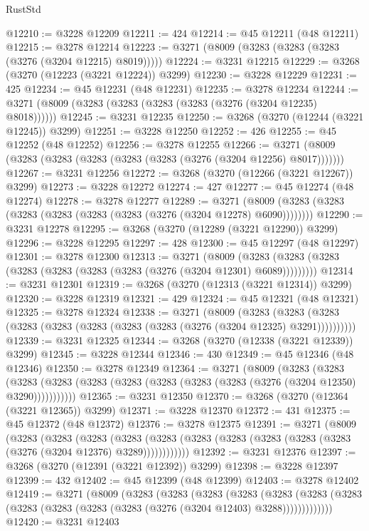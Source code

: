 \begin{lexlean}{RustStd}
\begin{coremodule}
@12210 := @3228 @12209
@12211 := 424
@12214 := @45 @12211 (@48 @12211)
@12215 := @3278 @12214
@12223 := @3271 (@8009 (@3283 (@3283 (@3283 (@3276 (@3204 @12215) @8019)))))
@12224 := @3231 @12215
@12229 := @3268 (@3270 (@12223 (@3221 @12224)) @3299)
@12230 := @3228 @12229
@12231 := 425
@12234 := @45 @12231 (@48 @12231)
@12235 := @3278 @12234
@12244 := @3271 (@8009 (@3283 (@3283 (@3283 (@3283 (@3276 (@3204 @12235) @8018))))))
@12245 := @3231 @12235
@12250 := @3268 (@3270 (@12244 (@3221 @12245)) @3299)
@12251 := @3228 @12250
@12252 := 426
@12255 := @45 @12252 (@48 @12252)
@12256 := @3278 @12255
@12266 := @3271 (@8009 (@3283 (@3283 (@3283 (@3283 (@3283 (@3276 (@3204 @12256) @8017)))))))
@12267 := @3231 @12256
@12272 := @3268 (@3270 (@12266 (@3221 @12267)) @3299)
@12273 := @3228 @12272
@12274 := 427
@12277 := @45 @12274 (@48 @12274)
@12278 := @3278 @12277
@12289 := @3271 (@8009 (@3283 (@3283 (@3283 (@3283 (@3283 (@3283 (@3276 (@3204 @12278) @6090))))))))
@12290 := @3231 @12278
@12295 := @3268 (@3270 (@12289 (@3221 @12290)) @3299)
@12296 := @3228 @12295
@12297 := 428
@12300 := @45 @12297 (@48 @12297)
@12301 := @3278 @12300
@12313 := @3271
    (@8009 (@3283 (@3283 (@3283 (@3283 (@3283 (@3283 (@3283 (@3276 (@3204 @12301) @6089)))))))))
@12314 := @3231 @12301
@12319 := @3268 (@3270 (@12313 (@3221 @12314)) @3299)
@12320 := @3228 @12319
@12321 := 429
@12324 := @45 @12321 (@48 @12321)
@12325 := @3278 @12324
@12338 := @3271
    (@8009
      (@3283 (@3283 (@3283 (@3283 (@3283 (@3283 (@3283 (@3283 (@3276 (@3204 @12325) @3291))))))))))
@12339 := @3231 @12325
@12344 := @3268 (@3270 (@12338 (@3221 @12339)) @3299)
@12345 := @3228 @12344
@12346 := 430
@12349 := @45 @12346 (@48 @12346)
@12350 := @3278 @12349
@12364 := @3271
    (@8009
      (@3283
        (@3283
          (@3283 (@3283 (@3283 (@3283 (@3283 (@3283 (@3283 (@3276 (@3204 @12350) @3290)))))))))))
@12365 := @3231 @12350
@12370 := @3268 (@3270 (@12364 (@3221 @12365)) @3299)
@12371 := @3228 @12370
@12372 := 431
@12375 := @45 @12372 (@48 @12372)
@12376 := @3278 @12375
@12391 := @3271
    (@8009
      (@3283
        (@3283
          (@3283
            (@3283 (@3283 (@3283 (@3283 (@3283 (@3283 (@3283 (@3276 (@3204 @12376) @3289))))))))))))
@12392 := @3231 @12376
@12397 := @3268 (@3270 (@12391 (@3221 @12392)) @3299)
@12398 := @3228 @12397
@12399 := 432
@12402 := @45 @12399 (@48 @12399)
@12403 := @3278 @12402
@12419 := @3271
    (@8009
      (@3283
        (@3283
          (@3283
            (@3283
              (@3283
                (@3283 (@3283 (@3283 (@3283 (@3283 (@3283 (@3276 (@3204 @12403) @3288)))))))))))))
@12420 := @3231 @12403

\end{coremodule}
\end{lexlean}
